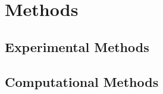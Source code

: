 \chapter{Methods}

\section{Experimental Methods}
\label{sec:expmeth}

\section{Computational Methods}
\label{sec:compmeth}


% 				
% 



